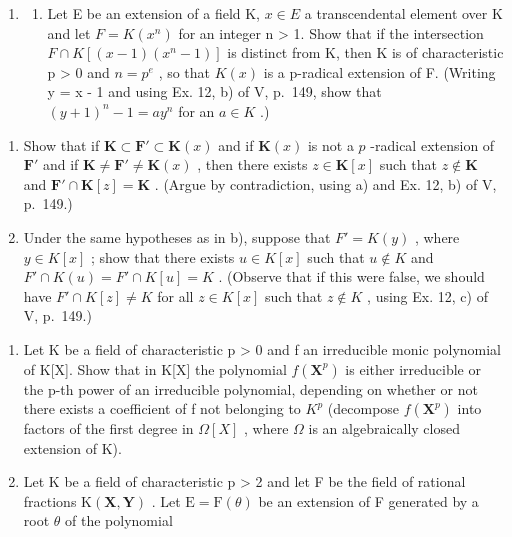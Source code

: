 \BourbakiExerciseGroup

\begin{enumerate}
\def\labelenumi{\arabic{enumi})}
\tightlist
\item
  \begin{enumerate}
  \def\labelenumii{\alph{enumii})}
  \tightlist
  \item
    Let E be an extension of a field K, \(x \in E\) a transcendental element over K and let \(F = K(x^{n})\) for an integer n \textgreater{} 1. Show that if the intersection \(F \cap K[(x - 1)(x^{n} - 1)]\) is distinct from K, then K is of characteristic p \textgreater{} 0 and \(n = p^{e}\) , so that \(K(x)\) is a p-radical extension of F. (Writing y = x - 1 and using Ex. 12, b) of V, p.~149, show that \((y + 1)^{n} - 1 = ay^{n}\) for an \(a \in K\) .)
  \end{enumerate}
\end{enumerate}

\begin{enumerate}
\def\labelenumi{\alph{enumi})}
\setcounter{enumi}{1}
\item
  Show that if \(\mathbf{K} \subset \mathbf{F}' \subset \mathbf{K}(x)\) and if \(\mathbf{K}(x)\) is not a \(p\) -radical extension of \(\mathbf{F}'\) and if \(\mathbf{K} \neq \mathbf{F}' \neq \mathbf{K}(x)\) , then there exists \(z \in \mathbf{K}[x]\) such that \(z \notin \mathbf{K}\) and \(\mathbf{F}' \cap \mathbf{K}[z] = \mathbf{K}\) . (Argue by contradiction, using a) and Ex. 12, b) of V, p.~149.)
\item
  Under the same hypotheses as in b), suppose that \(F' = K(y)\) , where \(y \in K[x]\) ; show that there exists \(u \in K[x]\) such that \(u \notin K\) and \(F' \cap K(u) = F' \cap K[u] = K\) . (Observe that if this were false, we should have \(F' \cap K[z] \neq K\) for all \(z \in K[x]\) such that \(z \notin K\) , using Ex. 12, c) of V, p.~149.)
\end{enumerate}

\begin{enumerate}
\def\labelenumi{\arabic{enumi})}
\setcounter{enumi}{1}
\item
  Let K be a field of characteristic p \textgreater{} 0 and f an irreducible monic polynomial of K{[}X{]}. Show that in K{[}X{]} the polynomial \(f(\mathbf{X}^{p})\) is either irreducible or the p-th power of an irreducible polynomial, depending on whether or not there exists a coefficient of f not belonging to \(K^{p}\) (decompose \(f(\mathbf{X}^{p})\) into factors of the first degree in \(\Omega[X]\) , where \(\Omega\) is an algebraically closed extension of K).
\item
  Let K be a field of characteristic p \textgreater{} 2 and let F be the field of rational fractions \(\mathrm{K}(\mathbf{X}, \mathbf{Y})\) . Let \(\mathrm{E} = \mathrm{F}(\theta)\) be an extension of F generated by a root \(\theta\) of the polynomial
\end{enumerate}

